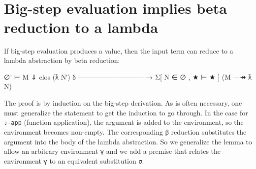 \begin{fence}
\begin{code}
\AgdaSymbol{|}\AgdaSpace{}%
\AgdaSpace{}%
\AgdaSymbol{=}\AgdaSpace{}%
\AgdaSpace{}%
\AgdaSpace{}%
\<%
\\
\>[0]\AgdaSpace{}%
\AgdaSpace{}%
\AgdaSpace{}%
\AgdaSymbol{=}\AgdaSpace{}%
\<%
\\
\>[0]\AgdaSpace{}%
\AgdaSymbol{(}\AgdaSpace{}%
\AgdaSpace{}%
\AgdaSymbol{)}\AgdaSpace{}%
\AgdaSymbol{(}\AgdaSpace{}%
\AgdaSpace{}%
\AgdaSymbol{)}\<%
\\
\>[0][@{}l@{\AgdaIndent{0}}]%
\>[4]\AgdaSpace{}%
\AgdaSpace{}%
\AgdaSpace{}%
\<%
\\
\>[0]\AgdaSpace{}%
\AgdaSymbol{|}\AgdaSpace{}%
\AgdaSpace{}%
\AgdaSymbol{=}\AgdaSpace{}%
\AgdaSpace{}%
\AgdaSpace{}%
\<%
\end{code}
\end{fence}

\hypertarget{big-step-evaluation-implies-beta-reduction-to-a-lambda}{%
\section{Big-step evaluation implies beta reduction to a
lambda}\label{big-step-evaluation-implies-beta-reduction-to-a-lambda}}

If big-step evaluation produces a value, then the input term can reduce
to a lambda abstraction by beta reduction:

\begin{myDisplay}
  ∅' ⊢ M ⇓ clos (ƛ N′) δ
  -----------------------------
→ Σ[ N ∈ ∅ , ★ ⊢ ★ ] (M —↠ ƛ N)
\end{myDisplay}

The proof is by induction on the big-step derivation. As is often
necessary, one must generalize the statement to get the induction to go
through. In the case for \texttt{⇓-app} (function application), the
argument is added to the environment, so the environment becomes
non-empty. The corresponding β reduction substitutes the argument into
the body of the lambda abstraction. So we generalize the lemma to allow
an arbitrary environment \texttt{γ} and we add a premise that relates
the environment \texttt{γ} to an equivalent substitution \texttt{σ}.

